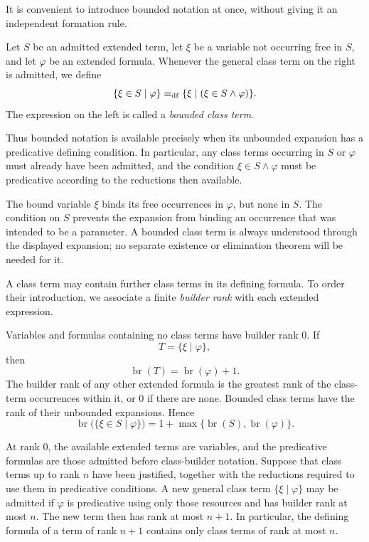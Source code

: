 
It is convenient to introduce bounded notation at once, without giving
it an independent formation rule.

\begin{definition}
\label{def:bounded-class-terms}
Let \(S\) be an admitted extended term, let \(\xi\) be a variable not
occurring free in \(S\), and let \(\varphi\) be an extended formula.
Whenever the general class term on the right is admitted, we define
\[
\{\xi\in S\mid\varphi\}
\mathrel{\equiv_{\mathrm{df}}}
\{\xi\mid(\xi\in S\land\varphi)\}.
\]
The expression on the left is called a \emph{bounded class term}.
\end{definition}

Thus bounded notation is available precisely when its unbounded
expansion has a predicative defining condition. In particular, any
class terms occurring in \(S\) or \(\varphi\) must already have been
admitted, and the condition \(\xi\in S\land\varphi\) must be
predicative according to the reductions then available.

The bound variable \(\xi\) binds its free occurrences in
\(\varphi\), but none in \(S\). The condition on \(S\) prevents the
expansion from binding an occurrence that was intended to be a
parameter. A bounded class term is always understood through the
displayed expansion; no separate existence or elimination theorem will
be needed for it.


A class term may contain further class terms in its defining formula.
To order their introduction, we associate a finite \emph{builder rank}
with each extended expression.

\begin{definition}
\label{def:builder-rank}
Variables and formulas containing no class terms have builder rank
\(0\). If
\[
T=\{\xi\mid\varphi\},
\]
then
\[
\operatorname{br}(T)=\operatorname{br}(\varphi)+1.
\]
The builder rank of any other extended formula is the greatest rank of
the class-term occurrences within it, or \(0\) if there are none.
Bounded class terms have the rank of their unbounded expansions. Hence
\[
\operatorname{br}\bigl(\{\xi\in S\mid\varphi\}\bigr)
=
1+\max\bigl\{\operatorname{br}(S),
             \operatorname{br}(\varphi)\bigr\}.
\]
\end{definition}

At rank \(0\), the available extended terms are variables, and the
predicative formulas are those admitted before class-builder notation.
Suppose that class terms up to rank \(n\) have been justified, together
with the reductions required to use them in predicative conditions.
A new general class term \(\{\xi\mid\varphi\}\) may be admitted if
\(\varphi\) is predicative using only those resources and has builder
rank at most \(n\). The new term then has rank at most \(n+1\).
In particular, the defining formula of a term of rank \(n+1\) contains
only class terms of rank at most \(n\).

